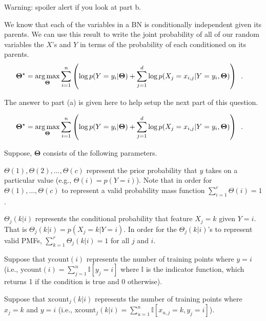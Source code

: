 \documentclass[assignment04_Solutions]{subfiles}
\begin{document}
\begin{exercise}[(60 minutes)]
Warning: spoiler alert if you look at part b.
\begin{boxedsolution}
We know that each of the variables in a BN is conditionally independent given its parents.  We can use this result to write the joint probability of all of our random variables the $X$'s and $Y$ in terms of the probability of each conditioned on its parents.
\begin{align}
\mathbf{\Theta^\star} &= \operatorname*{arg\,max}_{\mathbf{\Theta}} \sum_{i=1}^n  \left ( \log p(Y = y_i | \mathbf{\Theta})  + \sum_{j=1}^d \log p(X_j = x_{i,j} | Y = y_i,  \mathbf{\Theta}) \right ) \enspace . 
\end{align}
\end{boxedsolution}

\item The answer to part (a) is given here to help setup the next part of this question.

\begin{align}
\mathbf{\Theta^\star} &= \operatorname*{arg\,max}_{\mathbf{\Theta}} \sum_{i=1}^n  \left ( \log p(Y = y_i  | \mathbf{\Theta})  + \sum_{j=1}^d \log p(X_j = x_{i,j} | Y = y_i,  \mathbf{\Theta}) \right ) \enspace . \label{eq:nbmlesolved}
\end{align}

Suppose, $\mathbf{\Theta}$ consists of the following parameters.
\bi
\item $\Theta(1), \Theta(2), \ldots, \Theta(c)$ represent the prior probability that $y$ takes on a particular value (e.g., $\Theta(i) = p(Y = i)$).  Note that in order for $\Theta(1), \ldots, \Theta(c)$ to represent a valid probability mass function $\sum_{i=1}^c \Theta(i) = 1$.
\item $\Theta_{j}(k | i)$ represents the conditional probability that feature $X_j = k$ given $Y = i$.  That is $\Theta_{j}(k | i) = p(X_j = k | Y = i)$.  In order for the $\Theta_j(k|i)$'s to represent valid PMFs, $\sum_{k=1}^{r} \Theta_{j}(k | i) = 1$ for all $j$ and $i$.
\ei

Suppose that $\mbox{ycount}(i)$ represents the number of training points where $y = i$ (i.e., $\mbox{ycount}(i) = \sum_{j=1}^n \mathbb{I} \left [y_j = i \right]$ where $\mathbb{I}$ is the indicator function, which returns 1 if the condition is true and 0 otherwise).

Suppose that $\mbox{xcount}_j(k|i)$ represents the number of training points where $x_j = k$ and $y = i$ (i.e., $\mbox{xcount}_j (k|i) = \sum_{u=1}^n \mathbb{I} \left [ x_{u, j} = k, y_j = i \right ]$).


\end{exercise}
\end{document}
